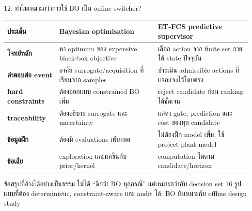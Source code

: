 \documentclass[aspectratio=169,12pt]{beamer}
\begin{document}
\begin{frame}[shrink=12]{12. ทำไมเหมาะกว่าการใช้ BO เป็น online switcher?}
\small
\begin{tabularx}{\textwidth}{>{\bfseries}p{}XX}
\toprule
ประเด็น & Bayesian optimisation & ET-FCS predictive supervisor \\
\midrule
โจทย์หลัก & หา optimum ของ expensive black-box objective & เลือก action จาก finite set ภายใต้ state ปัจจุบัน \\
คำตอบต่อ event & อาศัย surrogate/acquisition ที่เรียนจาก samples & ประเมิน admissible actions ที่แจกแจงไว้โดยตรง \\
hard constraints & ต้องออกแบบ constrained BO เพิ่ม & reject candidate ก่อน ranking ได้ชัดเจน \\
traceability & ต้องอธิบาย surrogate และ uncertainty & แสดง gate, prediction และ cost ของทุก candidate \\
ข้อมูลฝึก & ต้องมี evaluations เพียงพอ & ไม่ต้องฝึก model เพิ่ม; ใช้ project plant model \\
ข้อเสีย & exploration และผลขึ้นกับ prior/kernel & computation โตตาม candidate/horizon \\
\bottomrule
\end{tabularx}
\vspace{.25cm}
\begin{block}{ข้อสรุปที่อ้างได้อย่างเป็นธรรม}
ไม่ได้ ``ดีกว่า BO ทุกกรณี'' แต่เหมาะกว่ากับ decision set 16 รูปแบบที่ต้อง deterministic, constraint-aware และ audit ได้; BO ยังเหมาะกับ offline design study
\end{block}
\end{frame}
\end{document}
